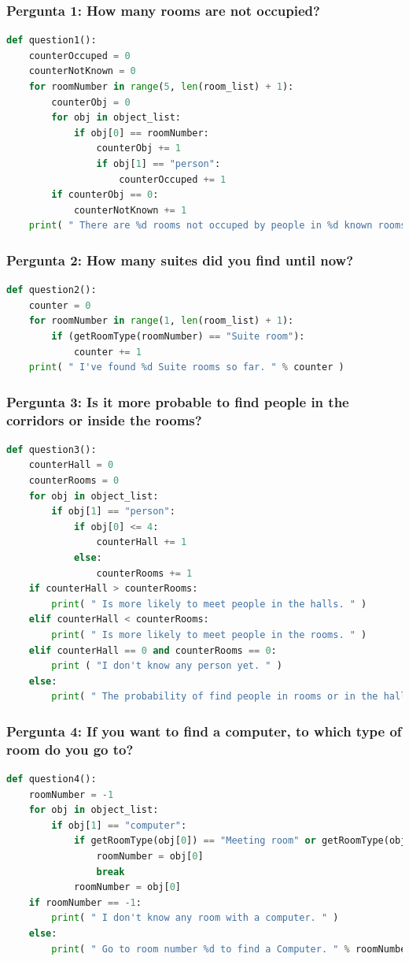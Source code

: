 \documentclass{article}
\begin{document}
\subsubsection{Pergunta 1: How many rooms are not occupied?}
\begin{lstlisting}[language=Python]
  def question1():
	counterOccuped = 0
	counterNotKnown = 0
	for roomNumber in range(5, len(room_list) + 1):
		counterObj = 0
		for obj in object_list:
			if obj[0] == roomNumber:
				counterObj += 1
				if obj[1] == "person":
					counterOccuped += 1
		if counterObj == 0:
			counterNotKnown += 1
	print( " There are %d rooms not occuped by people in %d known rooms. " % (((10 - counterNotKnown) - counterOccuped), (10 - counterNotKnown)) ) 
\end{lstlisting}

\subsubsection{Pergunta 2: How many suites did you find until now?}
\begin{lstlisting}[language=Python]
  def question2():
	counter = 0
	for roomNumber in range(1, len(room_list) + 1):
		if (getRoomType(roomNumber) == "Suite room"):
			counter += 1
	print( " I've found %d Suite rooms so far. " % counter )
\end{lstlisting}

\subsubsection{Pergunta 3: Is it more probable to find people in the corridors or inside the rooms?}
\begin{lstlisting}[language=Python]
  def question3():
	counterHall = 0
	counterRooms = 0
	for obj in object_list:
		if obj[1] == "person":
			if obj[0] <= 4:
				counterHall += 1
			else:
				counterRooms += 1
	if counterHall > counterRooms:
		print( " Is more likely to meet people in the halls. " )
	elif counterHall < counterRooms:
		print( " Is more likely to meet people in the rooms. " )
	elif counterHall == 0 and counterRooms == 0:
		print ( "I don't know any person yet. " )
	else:
		print( " The probability of find people in rooms or in the halls is equal. " )
\end{lstlisting}

\subsubsection{Pergunta 4: If you want to find a computer, to which type of room do you go to?}
\begin{lstlisting}[language=Python]
  def question4():
	roomNumber = -1
	for obj in object_list:
		if obj[1] == "computer":
			if getRoomType(obj[0]) == "Meeting room" or getRoomType(obj[0]) == "Generic room": # Only for privacy :)  
				roomNumber = obj[0]
				break
			roomNumber = obj[0]
	if roomNumber == -1:
		print( " I don't know any room with a computer. " )
	else:
		print( " Go to room number %d to find a Computer. " % roomNumber )
\end{lstlisting}
\end{document}
